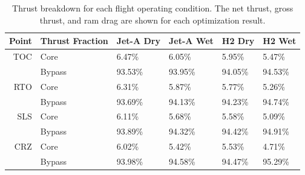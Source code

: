 \documentclass[conf]{new-aiaa}
\begin{document}
\begin{table}[hbt!]
    \centering
    \caption{Thrust breakdown for each flight operating condition.
        The net thrust, gross thrust, and ram drag are shown for each optimization result.
    }
    \small
    \renewcommand{\arraystretch}{1.2}
    \begin{tabular}{r l l l l l}
        Point & Thrust Fraction & Jet-A Dry & Jet-A Wet & H2 Dry  & H2 Wet  \\
        \toprule
        TOC   & Core            & 6.47\%    & 6.05\%    & 5.95\%  & 5.47\%  \\
              & Bypass          & 93.53\%   & 93.95\%   & 94.05\% & 94.53\% \\
        \hline
        RTO   & Core            & 6.31\%    & 5.87\%    & 5.77\%  & 5.26\%  \\
              & Bypass          & 93.69\%   & 94.13\%   & 94.23\% & 94.74\% \\
        \hline
        SLS   & Core            & 6.11\%    & 5.68\%    & 5.58\%  & 5.09\%  \\
              & Bypass          & 93.89\%   & 94.32\%   & 94.42\% & 94.91\% \\
        \hline
        CRZ   & Core            & 6.02\%    & 5.42\%    & 5.53\%  & 4.71\%  \\
              & Bypass          & 93.98\%   & 94.58\%   & 94.47\% & 95.29\% \\
        \bottomrule
    \end{tabular}
    \label{tab:thrust}
\end{table}

\end{document}
